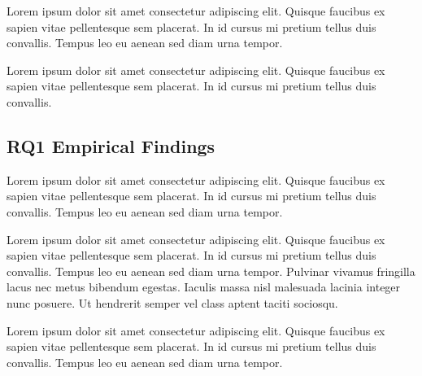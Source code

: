 \documentclass[sigconf,nonacm]{acmart} %
\begin{document}
Lorem ipsum dolor sit amet consectetur adipiscing elit. 
Quisque faucibus ex sapien vitae pellentesque sem placerat. 
In id cursus mi pretium tellus duis convallis. 
Tempus leo eu aenean sed diam urna tempor.

Lorem ipsum dolor sit amet consectetur adipiscing elit. 
Quisque faucibus ex sapien vitae pellentesque sem placerat. 
In id cursus mi pretium tellus duis convallis. 

\subsection{RQ1 Empirical Findings}
\label{subsec:rq1_findings}

Lorem ipsum dolor sit amet consectetur adipiscing elit. 
Quisque faucibus ex sapien vitae pellentesque sem placerat. 
In id cursus mi pretium tellus duis convallis. 
Tempus leo eu aenean sed diam urna tempor.

Lorem ipsum dolor sit amet consectetur adipiscing elit. 
Quisque faucibus ex sapien vitae pellentesque sem placerat.
In id cursus mi pretium tellus duis convallis. 
Tempus leo eu aenean sed diam urna tempor.
Pulvinar vivamus fringilla lacus nec metus bibendum egestas. 
Iaculis massa nisl malesuada lacinia integer nunc posuere.
Ut hendrerit semper vel class aptent taciti sociosqu. 

Lorem ipsum dolor sit amet consectetur adipiscing elit. 
Quisque faucibus ex sapien vitae pellentesque sem placerat. 
In id cursus mi pretium tellus duis convallis. 
Tempus leo eu aenean sed diam urna tempor.
\end{document}
